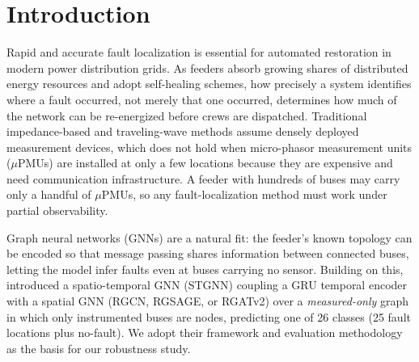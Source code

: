 \documentclass[3p,times,procedia]{elsarticle}
\begin{document}
\enlargethispage{-3\baselineskip}

\section{Introduction}

Rapid and accurate fault localization is essential for automated restoration in modern power distribution grids. As feeders absorb growing shares of distributed energy resources and adopt self-healing schemes, how precisely a system identifies where a fault occurred, not merely that one occurred, determines how much of the network can be re-energized before crews are dispatched. Traditional impedance-based and traveling-wave methods assume densely deployed measurement devices, which does not hold when micro-phasor measurement units ($\mu$PMUs) are installed at only a few locations because they are expensive and need communication infrastructure. A feeder with hundreds of buses may carry only a handful of $\mu$PMUs, so any fault-localization method must work under partial observability.

Graph neural networks (GNNs) are a natural fit: the feeder's known topology can be encoded so that message passing shares information between connected buses, letting the model infer faults even at buses carrying no sensor. Building on this, \cite{Karabulut2026} introduced a spatio-temporal GNN (STGNN) coupling a GRU temporal encoder with a spatial GNN (RGCN, RGSAGE, or RGATv2) over a \emph{measured-only} graph in which only instrumented buses are nodes, predicting one of 26 classes (25 fault locations plus no-fault). We adopt their framework and evaluation methodology as the basis for our robustness study.
\end{document}
